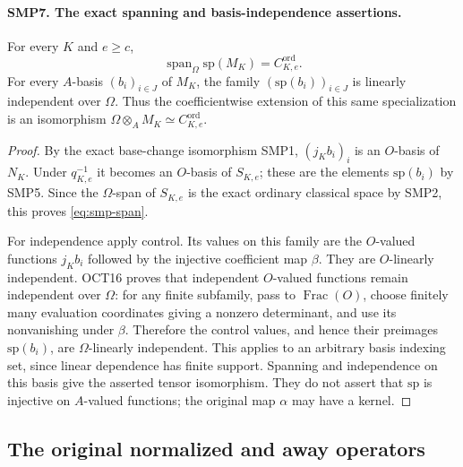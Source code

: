 \documentclass[11pt,a4paper]{article}
\numberwithin{equation}{section}
\theoremstyle{remark}\newtheorem{remark}[theorem]{Remark}
\begin{document}
\paragraph{SMP7. The exact spanning and basis-independence assertions.}
\label{claim:SMP7}
For every $K$ and $e\geq c$,
\begin{equation}\label{eq:smp-span}
      \operatorname{span}_\Omega\mathrm{sp}(M_K)
                             =C^{\mathrm{ord}}_{K,\allowbreak{} e}.
\end{equation}
For every $A$-basis $(b_i)_{i\in J}$ of $M_K$, the
family $(\mathrm{sp}(b_i))_{i\in J}$ is linearly
independent over $\Omega$.  Thus the coefficientwise
extension of this same specialization is an isomorphism
$\Omega\otimes_A M_K\simeq C^{\mathrm{ord}}_{K,\allowbreak{} e}$.
\begin{proof}
By the exact base-change isomorphism SMP1,
$(j_K b_i)_i$ is an $O$-basis of $N_K$.  Under
$q_{K,\allowbreak{} e}^{-1}$ it becomes an $O$-basis of $S_{K,\allowbreak{} e}$;
these are the elements $\mathrm{sp}(b_i)$ by SMP5.
Since the $\Omega$-span of $S_{K,\allowbreak{} e}$ is the exact
ordinary classical space by SMP2, this proves
\eqref{eq:smp-span}.

For independence apply control.  Its values on this
family are the $O$-valued functions $j_K b_i$ followed
by the injective coefficient map $\beta$.
They are $O$-linearly independent.  OCT16 proves that
independent $O$-valued functions remain independent
over $\Omega$: for any finite subfamily, pass to
$\operatorname{Frac}(O)$, choose finitely many evaluation
coordinates giving a nonzero determinant, and use its
nonvanishing under $\beta$.  Therefore the control
values, and hence their preimages
$\mathrm{sp}(b_i)$, are $\Omega$-linearly independent.
This applies to an arbitrary basis indexing set,
since linear dependence has finite support.
Spanning and independence on this basis give the
asserted tensor isomorphism.  They do not assert that
$\mathrm{sp}$ is injective on $A$-valued functions;
the original map $\alpha$ may have a kernel.
\end{proof}

\subsection{The original normalized and away operators}

\end{document}
